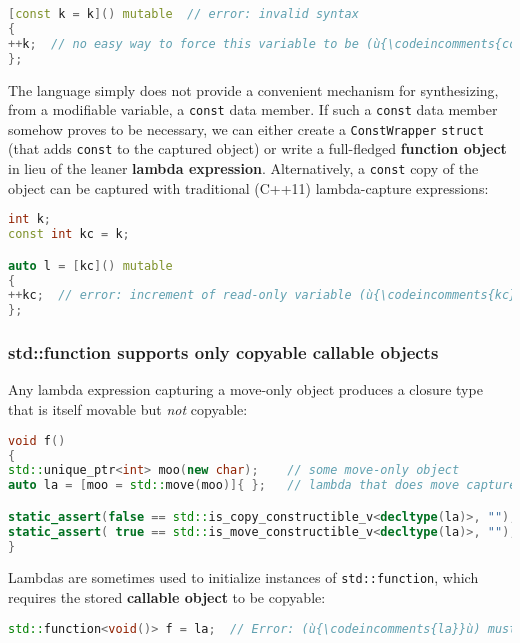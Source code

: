 \begin{lstlisting}[language=C++]
[const k = k]() mutable  // error: invalid syntax
{
++k;  // no easy way to force this variable to be (ù{\codeincomments{const}}ù)
};
\end{lstlisting}

\noindent The language simply does not provide a convenient mechanism for
synthesizing, from a modifiable variable, a \texttt{const} data member.
If such a \texttt{const} data member somehow proves to be necessary, we
can either create a \texttt{ConstWrapper} \texttt{struct} (that adds
\texttt{const} to the captured object) or write a full-fledged
\textbf{function object} in lieu of the leaner \textbf{lambda
expression}. Alternatively, a \texttt{const} copy of the object can be
captured with traditional (C++11) lambda-capture expressions:

\begin{lstlisting}[language=C++]
int k;
const int kc = k;

auto l = [kc]() mutable
{
++kc;  // error: increment of read-only variable (ù{\codeincomments{kc}}ù)
};
\end{lstlisting}


\subsubsection[{\ttfamily std::function} supports only copyable callable objects]{{\SubsubsecCode std::function} supports only copyable callable objects}\label{std::function-supports-only-copyable-callable-objects}

Any lambda expression capturing a move-only object produces a closure
type that is itself movable but \emph{not} copyable:

\begin{lstlisting}[language=C++]
void f()
{
std::unique_ptr<int> moo(new char);    // some move-only object
auto la = [moo = std::move(moo)]{ };   // lambda that does move capture

static_assert(false == std::is_copy_constructible_v<decltype(la)>, "");
static_assert( true == std::is_move_constructible_v<decltype(la)>, "");
}
\end{lstlisting}

\noindent Lambdas are sometimes used to initialize instances of
\texttt{std::function}, which requires the stored \textbf{callable
object} to be copyable:

\begin{lstlisting}[language=C++]
std::function<void()> f = la;  // Error: (ù{\codeincomments{la}}ù) must be copyable.
\end{lstlisting}

